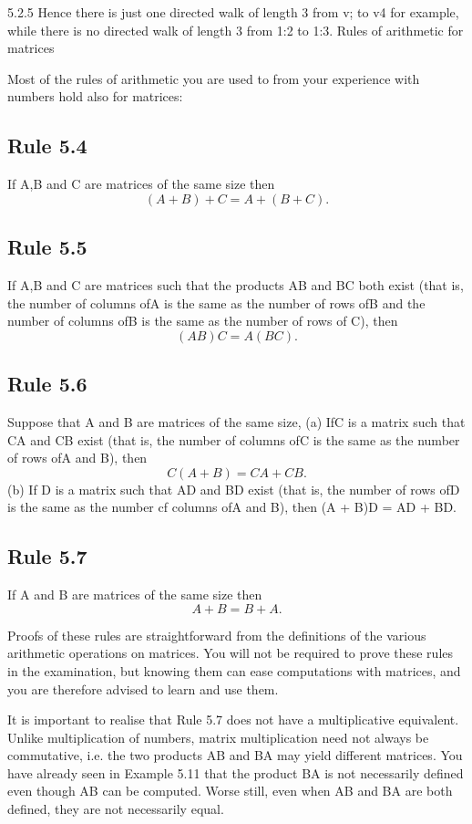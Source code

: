 5.2.5
Hence there is just one directed walk of length 3 from v; to v4 for
example, while there is no directed walk of length 3 from 1:2 to 1:3.
Rules of arithmetic for matrices

Most of the rules of arithmetic you are used to from your experience
with numbers hold also for matrices:

\subsection{Rule 5.4} If A,B and C are matrices of the same size then
\[(A+B)+C=A+(B+C).\]
\subsection{Rule 5.5} If A,B and C are matrices such that the products AB and BC
both exist (that is, the number of columns ofA is the same as the
number of rows ofB and the number of columns ofB is the same as
the number of rows of C), then
\[(AB)C = A(BC).\]
\subsection{Rule 5.6} Suppose that A and B are matrices of the same size,
(a) IfC is a matrix such that CA and CB exist (that is, the number of
columns ofC is the same as the number of rows ofA and B), then
\[C(A+ B) = CA+CB.\]
(b) If D is a matrix such that AD and BD exist (that is, the number
of rows ofD is the same as the number cf columns ofA and B),
then
(A + B)D = AD + BD.
\subsection{Rule 5.7} If A and B are matrices of the same size then
\[A + B = B + A.\]

Proofs of these rules are straightforward from the deﬁnitions of the
various arithmetic operations on matrices. You will not be required
to prove these rules in the examination, but knowing them can ease
computations with matrices, and you are therefore advised to learn
and use them.

It is important to realise that Rule 5.7 does not have a multiplicative
equivalent. Unlike multiplication of numbers, matrix multiplication
need not always be commutative, i.e. the two products AB and BA
may yield different matrices. You have already seen in Example 5.11
that the product BA is not necessarily deﬁned even though AB can
be computed. Worse still, even when AB and BA are both deﬁned,
they are not necessarily equal.

